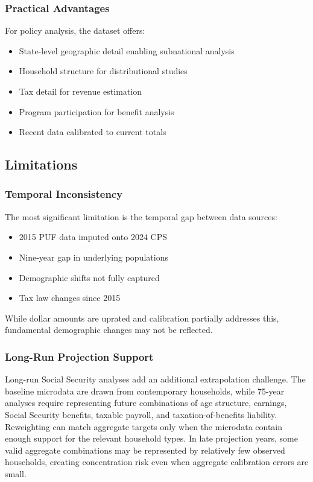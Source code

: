 \subsubsection{Practical Advantages}

For policy analysis, the dataset offers:
\begin{itemize}
\item State-level geographic detail enabling subnational analysis
\item Household structure for distributional studies
\item Tax detail for revenue estimation
\item Program participation for benefit analysis
\item Recent data calibrated to current totals
\end{itemize}

\subsection{Limitations}

\subsubsection{Temporal Inconsistency}

The most significant limitation is the temporal gap between data sources:
\begin{itemize}
\item 2015 PUF data imputed onto 2024 CPS
\item Nine-year gap in underlying populations
\item Demographic shifts not fully captured
\item Tax law changes since 2015
\end{itemize}

While dollar amounts are uprated and calibration partially addresses this, fundamental demographic changes may not be reflected.

\subsubsection{Long-Run Projection Support}

Long-run Social Security analyses add an additional extrapolation challenge. The baseline microdata are drawn from contemporary households, while 75-year analyses require representing future combinations of age structure, earnings, Social Security benefits, taxable payroll, and taxation-of-benefits liability. Reweighting can match aggregate targets only when the microdata contain enough support for the relevant household types. In late projection years, some valid aggregate combinations may be represented by relatively few observed households, creating concentration risk even when aggregate calibration errors are small.

